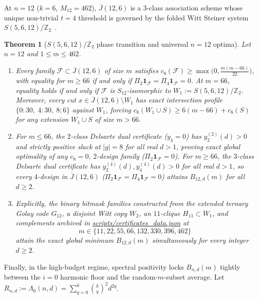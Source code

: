 \documentclass[11pt,reqno]{amsart}
\newtheorem{theorem}{Theorem}
\theoremstyle{definition}
\theoremstyle{remark}
\newcommand{\Jbar}{\overline{J}}
\newcommand{\F}{\mathcal{F}}
\begin{document}
At $n=12$ ($k=6$, $M_{12}=462$), $\Jbar(12,6)$ is a $3$-class association scheme whose unique non-trivial $t=4$ threshold is governed by the folded Witt Steiner system $S(5,6,12)/\mathbb{Z}_2$~\cite{Witt1938,KramerMesner1974}.

\begin{theorem}[$S(5,6,12)/\mathbb{Z}_2$ phase transition and universal $n=12$ optima]\label{thm:witt}
Let $n = 12$ and $1 \le m \le 462$.
\begin{enumerate}
\item[(a)] Every family $\F \subset \Jbar(12,6)$ of size $m$ satisfies $c_8(\F) \ge \max\bigl(0, \frac{m(m-66)}{22}\bigr)$, with equality for $m \ge 66$ if and only if $\Pi_2 \mathbf{1}_{\F} = \Pi_4 \mathbf{1}_{\F} = 0$. At $m=66$, equality holds if and only if $\F$ is $S_{12}$-isomorphic to $W_1 := S(5,6,12)/\mathbb{Z}_2$. Moreover, every cut $x \in \Jbar(12,6) \setminus W_1$ has exact intersection profile $\{0:30,\;4:30,\;8:6\}$ against $W_1$, forcing $c_8(W_1 \cup S) \ge 6(m-66) + c_8(S)$ for any extension $W_1 \cup S$ of size $m > 66$.
\item[(b)] For $m \le 66$, the $2$-class Delsarte dual certificate ($y_4 = 0$) has $y_2^{(2)}(d) > 0$ and strictly positive slack at $|g|=8$ for all real $d > 1$, proving exact global optimality of any $c_8 = 0$, $2$-design family ($\Pi_2 \mathbf{1}_{\F}=0$). For $m \ge 66$, the $3$-class Delsarte dual certificate has $y_2^{(4)}(d), y_4^{(4)}(d) > 0$ for all real $d > 1$, so every $4$-design in $\Jbar(12,6)$ ($\Pi_2 \mathbf{1}_{\F} = \Pi_4 \mathbf{1}_{\F} = 0$) attains $B_{12,d}(m)$ for all $d \ge 2$.
\item[(c)] Explicitly, the binary bitmask families constructed from the extended ternary Golay code $G_{12}$, a disjoint Witt copy $W_2$, an $11$-clique $H_{11} \subset W_1$, and complements archived in \url{scripts/certificates_data.json} at
\[
m \in \{11, 22, 55, 66, 132, 330, 396, 462\}
\]
attain the exact global minimum $B_{12,d}(m)$ simultaneously for every integer $d \ge 2$.
\end{enumerate}
\end{theorem}

Finally, in the high-budget regime, spectral positivity locks $B_{n,d}(m)$ tightly between the $i=0$ harmonic floor and the random-$m$-subset average. Let $R_{n,d} := \Lambda_0(n,d) = \sum_{q=0}^k \binom{k}{q}^2 d^{2q}$.
\end{document}
